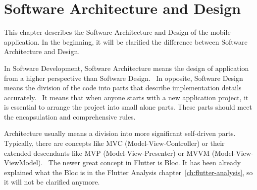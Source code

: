 \chapter{Software Architecture and Design}\label{ch:software-architecture-and-design}
This chapter describes the Software Architecture and Design of the mobile application.
In the beginning, it will be clarified the difference between Software Architecture and Design.

In Software Development, Software Architecture means the design of application from a higher perspective than Software Design.~\cite{softwareArchitecture}
In opposite, Software Design means the division of the code into parts that describe implementation details accurately.~\cite{softwareDesign}
It means that when anyone starts with a new application project, it is essential to arrange the project into small alone parts.
These parts should meet the encapsulation and comprehensive rules.

Architecture usually means a division into more significant self-driven parts.
Typically, there are concepts like MVC (Model-View-Controller) or their extended descendants like MVP (Model-View-Presenter) or MVVM (Model-View-ViewModel).~\cite{mvc}
The newer great concept in Flutter is Bloc.
It has been already explained what the Bloc is in the Flutter Analysis chapter~\ref{ch:flutter-analysis}, so it will not be clarified anymore.



